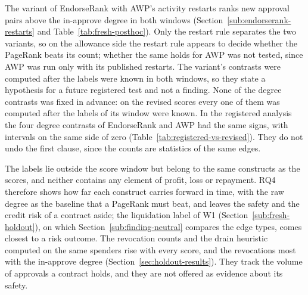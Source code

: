 The variant of EndorseRank with AWP's activity restarts ranks new approval pairs above the in-approve degree in both windows (Section~\ref{sub:endorserank-restarts} and Table~\ref{tab:fresh-posthoc}). Only the restart rule separates the two variants, so on the allowance side the restart rule appears to decide whether the PageRank beats its count; whether the same holds for AWP was not tested, since AWP was run only with its published restarts. The variant's contrasts were computed after the labels were known in both windows, so they state a hypothesis for a future registered test and not a finding. None of the degree contrasts was fixed in advance: on the revised scores every one of them was computed after the labels of its window were known. In the registered analysis the four degree contrasts of EndorseRank and AWP had the same signs, with intervals on the same side of zero (Table~\ref{tab:registered-vs-revised}). They do not undo the first clause, since the counts are statistics of the same edges.

The labels lie outside the score window but belong to the same constructs as the scores, and neither contains any element of profit, loss or repayment. RQ4 therefore shows how far each construct carries forward in time, with the raw degree as the baseline that a PageRank must beat, and leaves the safety and the credit risk of a contract aside; the liquidation label of W1 (Section~\ref{sub:fresh-holdout}), on which Section~\ref{sub:finding-neutral} compares the edge types, comes closest to a risk outcome. The revocation counts and the drain heuristic computed on the same spenders rise with every score, and the revocations most with the in-approve degree (Section~\ref{sec:holdout-results}). They track the volume of approvals a contract holds, and they are not offered as evidence about its safety.


